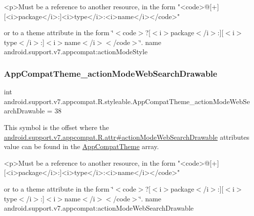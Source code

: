 \begin{DoxyVerb}      <p>Must be a reference to another resource, in the form "<code>@[+][<i>package</i>:]<i>type</i>:<i>name</i></code>"
\end{DoxyVerb}
 or to a theme attribute in the form \char`\"{}$<$code$>$?\mbox{[}$<$i$>$package$<$/i$>$\+:\mbox{]}\mbox{[}$<$i$>$type$<$/i$>$\+:\mbox{]}$<$i$>$name$<$/i$>$$<$/code$>$\char`\"{}.  name android.\+support.\+v7.\+appcompat\+:action\+Mode\+Style \mbox{\label{classandroid_1_1support_1_1v7_1_1appcompat_1_1R_1_1styleable_a0fdd41429fa2dd5551582ce389ca7ccb}} 
\subsubsection{\texorpdfstring{App\+Compat\+Theme\+\_\+action\+Mode\+Web\+Search\+Drawable}{AppCompatTheme\_actionModeWebSearchDrawable}}
{\footnotesize\ttfamily int android.\+support.\+v7.\+appcompat.\+R.\+styleable.\+App\+Compat\+Theme\+\_\+action\+Mode\+Web\+Search\+Drawable = 38\hspace{0.3cm}{\ttfamily [static]}}

This symbol is the offset where the \hyperlink{classandroid_1_1support_1_1v7_1_1appcompat_1_1R_1_1attr_a4d77b136a61a153fead099d874a18831}{android.\+support.\+v7.\+appcompat.\+R.\+attr\#action\+Mode\+Web\+Search\+Drawable} attribute\textquotesingle{}s value can be found in the \hyperlink{classandroid_1_1support_1_1v7_1_1appcompat_1_1R_1_1styleable_a5c42f89e8a410c323be34208d75c430b}{App\+Compat\+Theme} array.

\begin{DoxyVerb}      <p>Must be a reference to another resource, in the form "<code>@[+][<i>package</i>:]<i>type</i>:<i>name</i></code>"
\end{DoxyVerb}
 or to a theme attribute in the form \char`\"{}$<$code$>$?\mbox{[}$<$i$>$package$<$/i$>$\+:\mbox{]}\mbox{[}$<$i$>$type$<$/i$>$\+:\mbox{]}$<$i$>$name$<$/i$>$$<$/code$>$\char`\"{}.  name android.\+support.\+v7.\+appcompat\+:action\+Mode\+Web\+Search\+Drawable \mbox{\label{classandroid_1_1support_1_1v7_1_1appcompat_1_1R_1_1styleable_a5f0827c31aa835ebff88c10bb4cb11bb}} 
